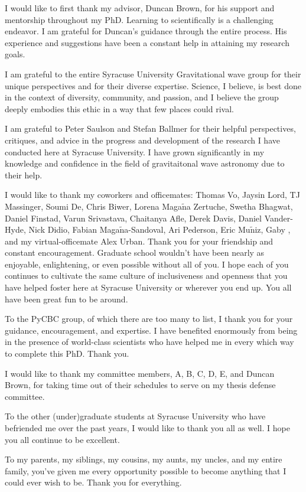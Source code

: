 I would like to first thank my advisor, Duncan Brown, for his support and mentorship throughout my PhD. Learning
to scientifically is a challenging endeavor. I am grateful for Duncan's guidance through
the entire process. His experience and suggestions have been a constant help in attaining my research goals.

I am grateful to the entire Syracuse University Gravitational wave group for their unique perspectives and for their
diverse expertise. Science, I believe, is best done in the context of diversity, community, and passion, and I believe
the group deeply embodies this ethic in a way that few places could rival.

I am grateful to Peter Saulson and Stefan Ballmer for their helpful perspectives, critiques, and advice in the
progress and development of the research I have conducted here at Syracuse University. I
have grown significantly in my knowledge and confidence in the field of
gravitaitonal wave astronomy due to their help.

I would like to thank my coworkers and officemates: Thomas Vo, Jaysin Lord, TJ Massinger, Soumi De, Chris Biwer,
Lorena Maga$\tilde{\text{n}}$a Zertuche, Swetha Bhagwat, Daniel Finstad, Varun Srivastava,
Chaitanya Afle, Derek Davis, Daniel Vander-Hyde, Nick Didio,
Fabian Maga$\tilde{\text{n}}$a-Sandoval, Ari Pederson, Eric Mu$\tilde{\text{n}}$iz, Gaby , and my virtual-officemate Alex Urban.
Thank you for your friendship and constant encouragement.
Graduate school wouldn't have been nearly as enjoyable, enlightening, or even possible without all of you.
I hope each of you continues to
cultivate the same culture of inclusiveness and openness that you have helped foster here at Syracuse University
or wherever you end up. You all have been great fun to be around.

To the PyCBC group, of which there are too many to list, I thank you for your guidance, encouragement, and
expertise. I have benefited enormously from being in the presence of world-class scientists who have helped
me in every which way to complete this PhD. Thank you. 

I would like to thank my committee members, A, B, C, D, E, 
and Duncan Brown, for taking time out of their schedules to serve on my thesis defense committee.

To the other (under)graduate students at Syracuse University who have befriended me over the past years, I would
like to thank you all as well. I hope you all continue to be excellent. 

To my parents, my siblings, my cousins, my aunts, my uncles, and my entire family, you've given me every opportunity
possible to become anything that I could ever wish to be. Thank you for everything.
